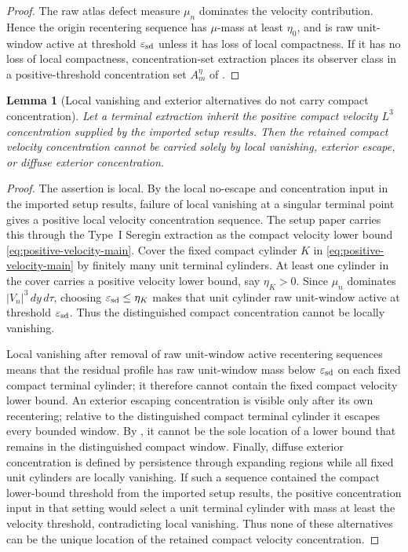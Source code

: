 \documentclass[11pt]{amsart}
\numberwithin{equation}{section}
\theoremstyle{plain}
\newtheorem{lemma}[lemma]{Lemma}
\theoremstyle{definition}
\theoremstyle{remark}
\newcommand{\eps}{\varepsilon}
\begin{document}
\begin{proof}
The raw atlas defect measure \(\mu_n\) dominates the velocity contribution.  Hence the
origin recentering sequence has \(\mu\)-mass at least \(\eta_0\), and is raw
unit-window active at threshold \(\eps_{\rm sd}\) unless it has loss of local compactness.  If it
has no loss of local compactness, concentration-set extraction places its observer
class in a positive-threshold concentration set \(A_m^\eta\) of
.
\end{proof}

\begin{lemma}[Local vanishing and exterior alternatives do not carry compact concentration]
\label{lem:radiative-stratum-exclusion}
Let a terminal extraction inherit the positive compact velocity \(L^3\) concentration
supplied by the imported setup results.  Then the retained
compact velocity concentration
cannot be carried solely by local vanishing, exterior escape, or diffuse
exterior concentration.
\end{lemma}

\begin{proof}
The assertion is local.  By the local no-escape and concentration input in
the imported setup results, failure of local vanishing at a singular terminal
point gives a positive local velocity concentration sequence.  The setup paper
carries this through the Type~I Seregin extraction as the compact velocity
lower bound \eqref{eq:positive-velocity-main}.  Cover the fixed compact
cylinder
\(K\) in \eqref{eq:positive-velocity-main} by finitely many unit terminal
cylinders.  At least one cylinder in the cover carries a positive velocity
lower bound, say \(\eta_K>0\).  Since \(\mu_n\) dominates
\(|V_n|^3\,dy\,d\tau\), choosing \(\eps_{\rm sd}\le\eta_K\) makes that unit
cylinder raw unit-window active at threshold \(\eps_{\rm sd}\).  Thus the distinguished compact
concentration cannot be locally vanishing.

Local vanishing after removal of raw unit-window active recentering sequences means
that the residual profile has raw unit-window mass below \(\eps_{\rm sd}\) on each fixed
compact terminal cylinder; it therefore cannot contain the fixed compact
velocity lower bound.  An exterior escaping concentration is visible only after
its own recentering; relative to the distinguished compact terminal cylinder it
escapes every bounded window.  By
, it cannot be the sole location of a
lower bound that remains in the distinguished compact window.  Finally, diffuse
exterior concentration is defined by persistence through expanding regions
while all fixed unit cylinders are locally vanishing.  If such a sequence
contained the compact lower-bound threshold from the imported setup results, the
positive concentration input in that setting would select a unit terminal
cylinder with mass
at least the velocity threshold, contradicting local vanishing.  Thus none of
these alternatives can be the unique location of the retained compact velocity
concentration.
\end{proof}
\end{document}

